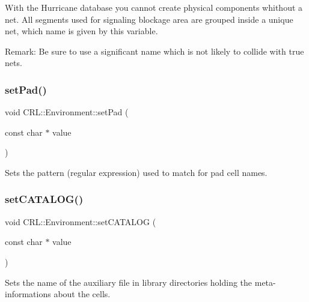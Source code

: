 With the Hurricane database you cannot create physical components whithout a net. All segments used for signaling blockage area are grouped inside a unique net, which name is given by this variable.

\begin{DoxyParagraph}{Remark\+: Be sure to use a significant name which is not likely to collide}
with true nets. 
\end{DoxyParagraph}
\mbox{\label{classCRL_1_1Environment_a06c179d70d3065f0bfe398a02e4c6359}} 
\subsubsection{\texorpdfstring{set\+Pad()}{setPad()}}
{\footnotesize\ttfamily void C\+R\+L\+::\+Environment\+::set\+Pad (\begin{DoxyParamCaption}\item[{const char $\ast$}]{value }\end{DoxyParamCaption})}

Sets the pattern (regular expression) used to match for pad cell names. \mbox{\label{classCRL_1_1Environment_a02b727f207875cebefbb59842c1efe70}} 
\subsubsection{\texorpdfstring{set\+C\+A\+T\+A\+L\+O\+G()}{setCATALOG()}}
{\footnotesize\ttfamily void C\+R\+L\+::\+Environment\+::set\+C\+A\+T\+A\+L\+OG (\begin{DoxyParamCaption}\item[{const char $\ast$}]{value }\end{DoxyParamCaption})\hspace{0.3cm}{\ttfamily [inline]}}

Sets the name of the auxiliary file in library directories holding the meta-\/informations about the cells. \mbox{\label{classCRL_1_1Environment_a315f5a14de9dc354cf81728adb29a8c6}} 
